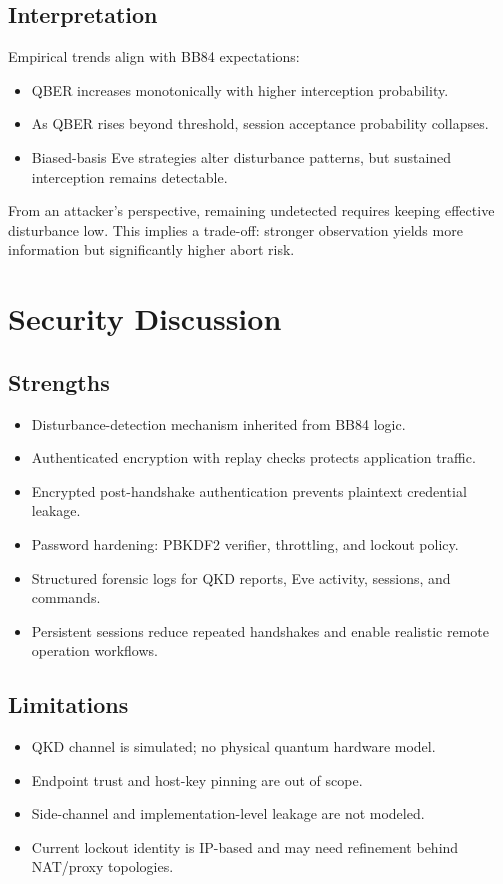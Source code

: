 \documentclass[11pt,a4paper]{article}
\begin{document}
\subsection{Interpretation}
Empirical trends align with BB84 expectations:
\begin{itemize}[leftmargin=1.5em]
  \item QBER increases monotonically with higher interception probability.
  \item As QBER rises beyond threshold, session acceptance probability collapses.
  \item Biased-basis Eve strategies alter disturbance patterns, but sustained interception remains detectable.
\end{itemize}

From an attacker's perspective, remaining undetected requires keeping effective disturbance low. This implies a trade-off: stronger observation yields more information but significantly higher abort risk.

\section{Security Discussion}
\subsection{Strengths}
\begin{itemize}[leftmargin=1.5em]
  \item Disturbance-detection mechanism inherited from BB84 logic.
  \item Authenticated encryption with replay checks protects application traffic.
  \item Encrypted post-handshake authentication prevents plaintext credential leakage.
  \item Password hardening: PBKDF2 verifier, throttling, and lockout policy.
  \item Structured forensic logs for QKD reports, Eve activity, sessions, and commands.
  \item Persistent sessions reduce repeated handshakes and enable realistic remote operation workflows.
\end{itemize}

\subsection{Limitations}
\begin{itemize}[leftmargin=1.5em]
  \item QKD channel is simulated; no physical quantum hardware model.
  \item Endpoint trust and host-key pinning are out of scope.
  \item Side-channel and implementation-level leakage are not modeled.
  \item Current lockout identity is IP-based and may need refinement behind NAT/proxy topologies.
\end{itemize}
\end{document}
